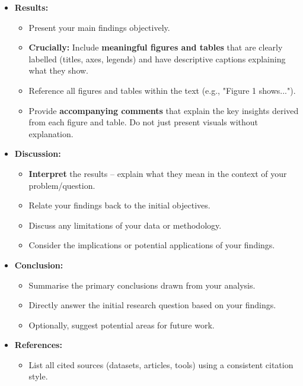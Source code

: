 \documentclass[11pt]{exam}
\begin{document}
\begin{itemize}
        \item \textbf{Results:}
        \begin{itemize}
            \item Present your main findings objectively.
            \item \textbf{Crucially:} Include \textbf{meaningful figures and tables} that are clearly labelled (titles, axes, legends) and have descriptive captions explaining what they show. %
            \item Reference all figures and tables within the text (e.g., "Figure 1 shows...").
            \item Provide \textbf{accompanying comments} that explain the key insights derived from each figure and table. Do not just present visuals without explanation.
        \end{itemize}

        \item \textbf{Discussion:}
        \begin{itemize}
            \item \textbf{Interpret} the results – explain what they mean in the context of your problem/question.
            \item Relate your findings back to the initial objectives.
            \item Discuss any limitations of your data or methodology.
            \item Consider the implications or potential applications of your findings.
        \end{itemize}

        \item \textbf{Conclusion:}
        \begin{itemize}
            \item Summarise the primary conclusions drawn from your analysis.
            \item Directly answer the initial research question based on your findings.
            \item Optionally, suggest potential areas for future work.
        \end{itemize}

        \item \textbf{References:}
        \begin{itemize}
            \item List all cited sources (datasets, articles, tools) using a consistent citation style.
        \end{itemize}


\end{itemize}
\end{document}
